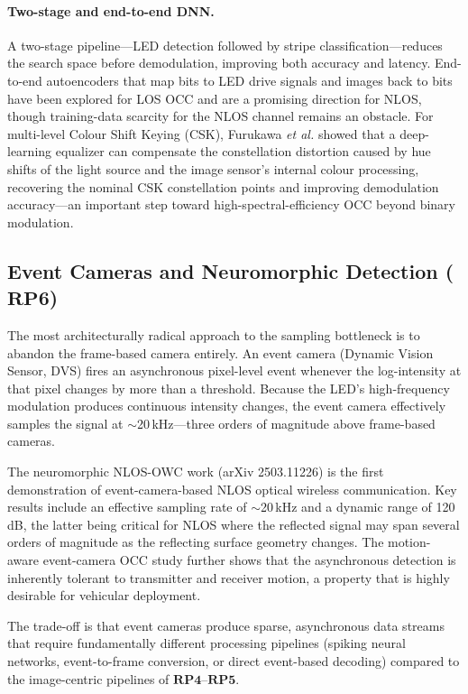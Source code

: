 \documentclass[10pt,a4paper]{article}
\newcommand{\rp}[1]{\textbf{RP#1}}
\begin{document}
\paragraph{Two-stage and end-to-end DNN.}
A two-stage pipeline---LED detection followed by stripe
classification---reduces the search space before demodulation, improving
both accuracy and latency. End-to-end autoencoders that map bits to LED
drive signals and images back to bits have been explored for LOS OCC and
are a promising direction for NLOS, though training-data scarcity for
the NLOS channel remains an obstacle. For multi-level Colour Shift
Keying (CSK), Furukawa \emph{et al.} \cite{furukawa2025cskdl} showed
that a deep-learning equalizer can compensate the constellation
distortion caused by hue shifts of the light source and the image
sensor's internal colour processing, recovering the nominal CSK
constellation points and improving demodulation accuracy---an important
step toward high-spectral-efficiency OCC beyond binary modulation.

\subsection{Event Cameras and Neuromorphic Detection ($\rp{6}$)}
\label{sec:rp6}

The most architecturally radical approach to the sampling bottleneck is
to abandon the frame-based camera entirely. An event camera (Dynamic
Vision Sensor, DVS) fires an asynchronous pixel-level event whenever the
log-intensity at that pixel changes by more than a threshold. Because
the LED's high-frequency modulation produces continuous intensity
changes, the event camera effectively samples the signal at
$\sim$20\,kHz---three orders of magnitude above frame-based cameras.

The neuromorphic NLOS-OWC work \cite{neuromorphic2025nlos} (arXiv
2503.11226) is the first demonstration of event-camera-based NLOS optical
wireless communication. Key results include an effective sampling rate
of $\sim$20\,kHz and a dynamic range of 120\,dB, the latter being
critical for NLOS where the reflected signal may span several orders of
magnitude as the reflecting surface geometry changes. The motion-aware
event-camera OCC study \cite{event2024motion} further shows that the
asynchronous detection is inherently tolerant to transmitter and receiver
motion, a property that is highly desirable for vehicular deployment.

The trade-off is that event cameras produce sparse, asynchronous data
streams that require fundamentally different processing pipelines
(spiking neural networks, event-to-frame conversion, or direct
event-based decoding) compared to the image-centric pipelines of
$\rp{4}$--$\rp{5}$.
\end{document}
